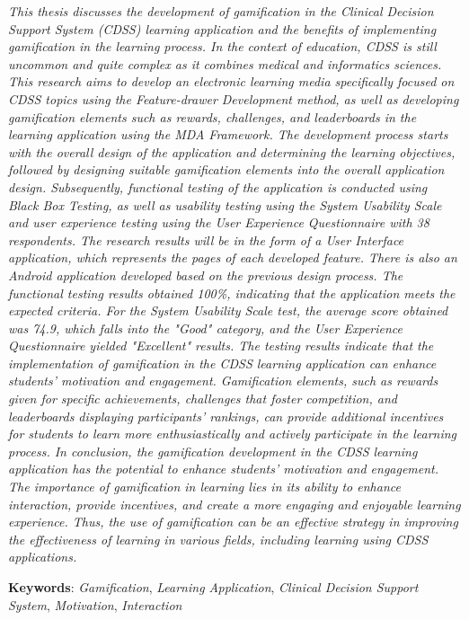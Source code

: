 \textit{
	This thesis discusses the development of gamification in the Clinical Decision Support System (CDSS) learning application and the benefits of implementing gamification in the learning process. In the context of education, CDSS is still uncommon and quite complex as it combines medical and informatics sciences.
	This research aims to develop an electronic learning media specifically focused on CDSS topics using the Feature-drawer Development method, as well as developing gamification elements such as rewards, challenges, and leaderboards in the learning application using the MDA Framework. The development process starts with the overall design of the application and determining the learning objectives, followed by designing suitable gamification elements into the overall application design.
	Subsequently, functional testing of the application is conducted using Black Box Testing, as well as usability testing using the System Usability Scale and user experience testing using the User Experience Questionnaire with 38 respondents.
	The research results will be in the form of a User Interface application, which represents the pages of each developed feature. There is also an Android application developed based on the previous design process. The functional testing results obtained 100\%, indicating that the application meets the expected criteria. For the System Usability Scale test, the average score obtained was 74.9, which falls into the "Good" category, and the User Experience Questionnaire yielded "Excellent" results.
	The testing results indicate that the implementation of gamification in the CDSS learning application can enhance students' motivation and engagement. Gamification elements, such as rewards given for specific achievements, challenges that foster competition, and leaderboards displaying participants' rankings, can provide additional incentives for students to learn more enthusiastically and actively participate in the learning process.
	In conclusion, the gamification development in the CDSS learning application has the potential to enhance students' motivation and engagement. The importance of gamification in learning lies in its ability to enhance interaction, provide incentives, and create a more engaging and enjoyable learning experience. Thus, the use of gamification can be an effective strategy in improving the effectiveness of learning in various fields, including learning using CDSS applications.
}

\noindent\textbf{Keywords}: \textit{Gamification}, \textit{Learning Application}, \textit{Clinical Decision Support System}, \textit{Motivation}, \textit{Interaction}